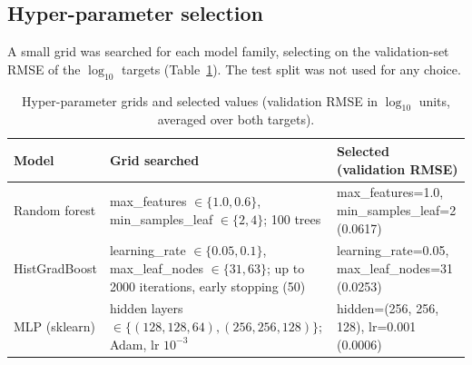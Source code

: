 \documentclass[11pt,a4paper]{article}
\begin{document}
\subsection{Hyper-parameter selection}
A small grid was searched for each model family, selecting on the validation-set RMSE of the $\log_{10}$ targets
(Table~\ref{tab:hp}). The test split was not used for any choice.
\begin{table}[H]\centering\footnotesize
\caption{Hyper-parameter grids and selected values (validation RMSE in $\log_{10}$ units, averaged over both targets).}
\label{tab:hp}
\begin{tabular}{p{2.6cm}p{6.6cm}p{5.4cm}}
\toprule
Model & Grid searched & Selected (validation RMSE)\\
\midrule
Random forest & max\_features $\in\{1.0,0.6\}$, min\_samples\_leaf $\in\{2,4\}$; 100 trees & max\_features=1.0, min\_samples\_leaf=2 (0.0617)\\
HistGradBoost & learning\_rate $\in\{0.05,0.1\}$, max\_leaf\_nodes $\in\{31,63\}$; up to 2000 iterations, early stopping (50) & learning\_rate=0.05, max\_leaf\_nodes=31 (0.0253)\\
MLP (sklearn) & hidden layers $\in\{(128,128,64),(256,256,128)\}$; Adam, lr $10^{-3}$ & hidden=(256, 256, 128), lr=0.001 (0.0006)\\
\bottomrule
\end{tabular}
\end{table}

\end{document}
